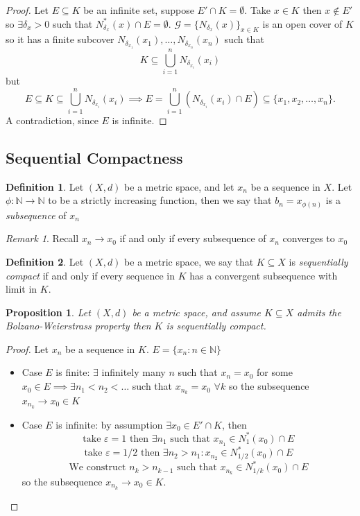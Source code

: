 \documentclass[11pt,openany]{book}
\theoremstyle{plain}
\newtheorem{proposition}{Proposition}[chapter]
\theoremstyle{definition}
\newtheorem{definition}{Definition}[chapter]
\theoremstyle{remark}
\newtheorem{remark}{Remark}[chapter]
\newcommand{\N}{\mathbb{N}}
\newcommand{\eps}{\varepsilon}
\begin{document}
\begin{proof}
    Let $E \subseteq K$ be an infinite set, suppose $E' \cap K = \emptyset$. Take $x \in K$ then $x \notin E'$ so $\exists \delta_x >0$ such that $N_{\delta_x}^*(x) \cap E = \emptyset$. $\mathcal{G} = \{N_{\delta_x}(x)\}_{x\in K}$ is an open cover of $K$ so it has a finite subcover $N_{\delta_{x_1}}(x_1), \dots , N_{\delta_{x_n}}(x_n)$ such that \[ K \subseteq \bigcup_{i=1}^n N_{\delta_{x_i}}(x_i) \] but \[ E \subseteq K \subseteq \bigcup_{i=1}^n N_{\delta_{x_i}}(x_i) \implies E= \bigcup_{i=1}^n \left(N_{\delta_{x_i}}(x_i)\cap E\right)\subseteq \{x_1, x_2, \dots , x_n \}.\] A contradiction, since $E$ is infinite.
\end{proof}




\subsection{Sequential Compactness}
\begin{definition}
Let $(X,d)$ be a metric space, and let $x_n$ be a sequence in $X$. Let $\phi: \N \to \N$ to be a strictly increasing function, then we say that $b_n = x_{\phi(n)}$ is a \emph{subsequence} of $x_n$
\end{definition}

\begin{remark}
    Recall $x_n \to x_0$ if and only if every subsequence of $x_n$ converges to $x_0$
\end{remark}

\begin{definition}
    Let $(X,d)$ be a metric space, we say that $K\subseteq X$ is \emph{sequentially compact} if and only if every sequence in $K$ has a convergent subsequence with limit in $K$.
\end{definition}

\begin{proposition}\label{prop:23}
    Let $(X,d)$ be a metric space, and assume $K\subseteq X$ admits the Bolzano-Weierstrass property then $K$ is sequentially compact.
\end{proposition}
\begin{proof}
Let $x_n$ be a sequence in $K$. $E = \{x_n : n \in \N\}$ 
    \begin{itemize}
        \item Case $E$ is finite: $\exists$ infinitely many $n$ such that $x_n = x_0$ for some $x_0 \in E \implies \exists n_1 < n_2 < \dots$ such that $x_{n_k} = x_0$ $\forall k$ so the subsequence $x_{n_k} \to x_0 \in K$
        \item Case $E$ is infinite: by assumption $\exists x_0 \in E'\cap K$, then \[\text{take } \eps = 1 \text{ then } \exists n_1 \text{ such that } x_{n_1} \in N_1^*(x_0) \cap E\] \[\text{take } \eps = 1/2 \text{ then } \exists n_2 > n_1 : x_{n_2} \in N_{1/2}^*(x_0) \cap E \]\[\text{We construct } n_k > n_{k-1} \text{ such that } x_{n_k} \in N_{1/k}^*(x_0) \cap E\] so the subsequence $x_{n_k} \to x_0 \in K$.
    \end{itemize}
\end{proof}
\end{document}
